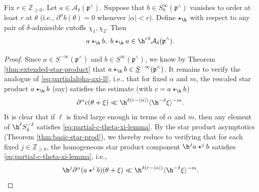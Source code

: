 \begin{lemma}\label{lem:star-product-asymptotics-applied-to-cal-A-delta}
  Fix $r \in \mathbb{Z}_{\geq 0}$.  Let $a \in \mathcal{A}_\delta(\mathfrak{p}^\wedge)$.  Suppose that $b \in S^\infty_0(\mathfrak{p}^\wedge)$ vanishes to order at least $r$ at $\theta$ (i.e., $\partial^\alpha b(\theta) = 0$ whenever $\lvert \alpha \rvert < r$).  Define $\star_{\h}$ with respect to any pair of $\delta$-admissible cutoffs $\chi_1, \chi_2$.  Then
  \begin{equation*}
    a \star_{\h} b, \, \, b \star_{\h} a \in \h^{r \delta} \mathcal{A}_\delta(\mathfrak{p}^\wedge).
  \end{equation*}
\end{lemma}
\begin{proof}
  Since $a \in \underline{S}^{-\infty}(\mathfrak{p}^\wedge)$ and $b \in \underline{S}^\infty(\mathfrak{p}^\wedge)$, we know by Theorem \ref{thm:extended-star-product} that $a \star_{\h} b \in \underline{S}^{-\infty}(\mathfrak{p}^\wedge)$.  It remains to verify the analogue of \eqref{eq:partialalpha-axi-ll}, i.e., that for fixed $\alpha$ and $m$, the rescaled star product $a \star_{\h} b$ (say) satisfies the estimate (with $c = a \star_{\h} b$)
  \begin{equation}\label{eq:partial-c-theta-xi-lemma}
    \partial^\alpha c(\theta + \xi) \ll \h^{\delta (r - |\alpha|)} \langle \h^{-\delta} \xi \rangle^{-m}.
  \end{equation}
  It is clear that if $\ell$ is fixed large enough in terms of $\alpha$ and $m$, then any element of $\h^\ell S_{\delta}^{-\ell}$ satisfies \eqref{eq:partial-c-theta-xi-lemma}.  By the star product asymptotics (Theorem \ref{thm:basic-star-prod}), we thereby reduce to verifying that for each fixed $j \in \mathbb{Z}_{\geq 0}$, the homogeneous star product component $\h^j a \star^j b$ satisfies \eqref{eq:partial-c-theta-xi-lemma}, i.e.,
  \begin{equation}\label{eq:cuhmv904yq}
    \h^j \partial^\alpha (a \star^j b)(\theta + \xi) \ll \h^{\delta (r - |\alpha|)} \langle \h^{-\delta} \xi \rangle^{-m}.
  \end{equation}


\end{proof}
